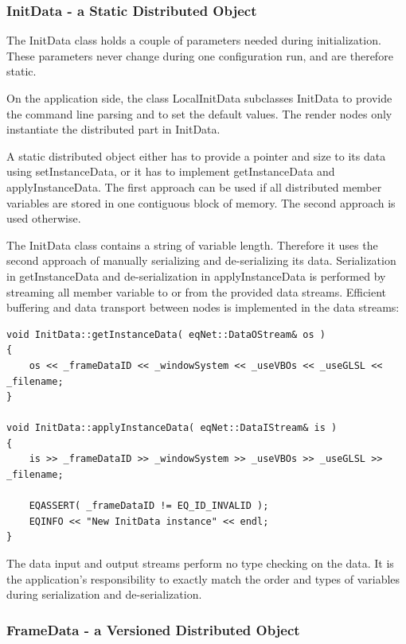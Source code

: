 \documentclass[10pt,a4]{scrartcl}
\begin{document}
\subsubsection{\label{sInitData}InitData - a Static Distributed Object}

The \textsf{InitData} class holds a couple of parameters needed during
initialization. These parameters never change during one configuration
run, and are therefore static.

On the application side, the class \textsf{LocalInitData} subclasses
\textsf{InitData} to provide the command line parsing and to set the
default values. The render nodes only instantiate the distributed part
in \textsf{InitData}.

A static distributed object either has to provide a pointer and size to
its data using \textsf{setInstanceData}, or it has to implement
\textsf{getInstanceData} and \textsf{applyInstanceData}. The first
approach can be used if all distributed member variables are stored in
one contiguous block of memory. The second approach is used otherwise.

The \textsf{InitData} class contains a string of variable
length. Therefore it uses the second approach of manually serializing
and de-serializing its data. Serialization in \textsf{getInstanceData}
and de-serialization in \textsf{applyInstanceData} is performed by
streaming all member variable to or from the provided data
streams. Efficient buffering and data transport between nodes is
implemented in the data streams:

{\footnotesize\begin{lstlisting}
void InitData::getInstanceData( eqNet::DataOStream& os )
{
    os << _frameDataID << _windowSystem << _useVBOs << _useGLSL << _filename;
}

void InitData::applyInstanceData( eqNet::DataIStream& is )
{
    is >> _frameDataID >> _windowSystem >> _useVBOs >> _useGLSL >> _filename;

    EQASSERT( _frameDataID != EQ_ID_INVALID );
    EQINFO << "New InitData instance" << endl;
}
\end{lstlisting}}%

The data input and output streams perform no type checking on the data.
It is the application's responsibility to exactly match the order and
types of variables during serialization and de-serialization.

\subsubsection{FrameData - a Versioned Distributed Object}
\end{document}
